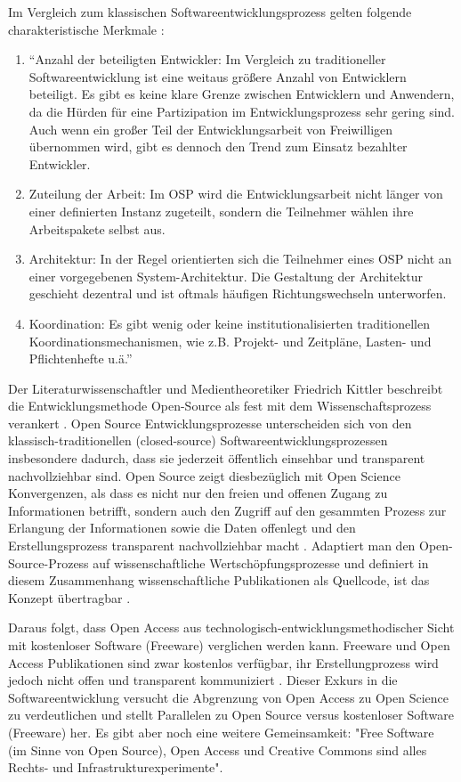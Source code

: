 Im Vergleich zum klassischen Softwareentwicklungsprozess gelten folgende charakteristische Merkmale \cite{suchen}:
\begin{enumerate}
\item “Anzahl der beteiligten Entwickler: Im Vergleich zu traditioneller Softwareentwicklung ist eine weitaus größere Anzahl von Entwicklern beteiligt. Es gibt es keine klare Grenze zwischen Entwicklern und Anwendern, da die Hürden für eine Partizipation im Entwicklungsprozess sehr gering sind. Auch wenn ein großer Teil der Entwicklungsarbeit von Freiwilligen übernommen wird, gibt es dennoch den Trend zum Einsatz bezahlter Entwickler.
\item Zuteilung der Arbeit: Im OSP wird die Entwicklungsarbeit nicht länger von einer definierten Instanz zugeteilt, sondern die Teilnehmer wählen ihre Arbeitspakete selbst aus.
\item Architektur: In der Regel orientierten sich die Teilnehmer eines OSP nicht an einer vorgegebenen System-Architektur. Die Gestaltung der Architektur geschieht dezentral und ist oftmals häufigen Richtungswechseln unterworfen.
\item Koordination: Es gibt wenig oder keine institutionalisierten traditionellen Koordinationsmechanismen, wie z.B. Projekt- und Zeitpläne, Lasten- und Pflichtenhefte u.ä.” \cite{suchen}
\end{enumerate}

Der Literaturwissenschaftler und Medientheoretiker Friedrich Kittler beschreibt die Entwicklungsmethode Open-Source als fest mit dem Wissenschaftsprozess verankert \cite{suchen}. Open Source Entwicklungsprozesse unterscheiden sich von den klassisch-traditionellen (closed-source) Softwareentwicklungsprozessen insbesondere dadurch, dass sie jederzeit öffentlich einsehbar und transparent nachvollziehbar sind. Open Source zeigt diesbezüglich mit Open Science Konvergenzen, als dass es nicht nur den freien und offenen Zugang zu Informationen betrifft, sondern auch den Zugriff auf den gesammten Prozess zur Erlangung der Informationen sowie die Daten offenlegt und den Erstellungsprozess transparent nachvollziehbar macht \cite{kelty_2004}. Adaptiert man den Open-Source-Prozess auf wissenschaftliche Wertschöpfungsprozesse und definiert in diesem Zusammenhang wissenschaftliche Publikationen als Quellcode, ist das Konzept übertragbar \cite{Singh_2008} \cite{Bradley_2008} \cite{Bradley_2007}. 

Daraus folgt, dass Open Access aus technologisch-entwicklungsmethodischer Sicht mit kostenloser Software (Freeware) \cite{suchen} verglichen werden kann. Freeware und Open Access Publikationen sind zwar kostenlos verfügbar, ihr Erstellungprozess wird jedoch nicht offen und transparent kommuniziert \cite{suchen}. Dieser Exkurs in die Softwareentwicklung versucht die Abgrenzung von Open Access zu Open Science zu verdeutlichen und stellt Parallelen zu Open Source versus kostenloser Software (Freeware) her. Es gibt aber noch eine  weitere Gemeinsamkeit: "Free Software (im Sinne von Open Source), Open Access und Creative Commons sind alles Rechts- und Infrastrukturexperimente"\cite{kelty_2004}.

